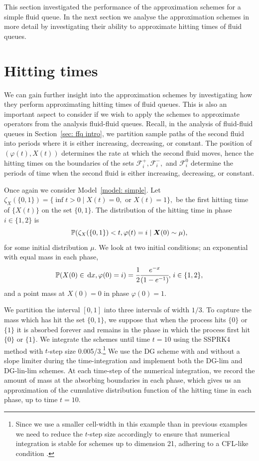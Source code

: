 This section investigated the performance of the approximation schemes for a simple fluid queue. In the next section we analyse the approximation schemes in more detail by investigating their ability to approximate hitting times of fluid queues. 

\FloatBarrier
\section{Hitting times}\label{sec: hit approx}
We can gain further insight into the approximation schemes by investigating how they perform approximating hitting times of fluid queues. This is also an important aspect to consider if we wish to apply the schemes to approximate operators from the analysis fluid-fluid queues. Recall, in the analysis of fluid-fluid queues in Section~\ref{sec: ffq intro}, we partition sample paths of the second fluid into periods where it is either increasing, decreasing, or constant. The position of \((\varphi(t),X(t))\) determines the rate at which the second fluid moves, hence the hitting times on the boundaries of the sets \(\mathcal F_i^+, \mathcal F_i^-,\) and \(\mathcal F_i^0\) determine the periods of time when the second fluid is either increasing, decreasing, or constant.

Once again we consider Model~\ref{model: simple}. Let \(\zeta_{X}(\{0,1\}) = \{\inf t>0 \mid X(t)=0, \mbox{ or }X(t)=1\},\) be the first hitting time of \(\{X(t)\}\) on the set \(\{0,1\}\). The distribution of the hitting time in phase \(i\in\{1,2\}\) is 
\begin{equation}\label{eqn: hit cdf}\mathbb P(\zeta_{X}(\{0,1\}) < t, \varphi(t)=i\mid \boldsymbol X(0)\sim \mu),\end{equation}
for some initial distribution \(\mu\). We look at two initial conditions; an exponential with equal mass in each phase, 
\[\mathbb P(X(0)\in\, \mathrm{d} x,\varphi(0)=i) = \cfrac{1}{2}\cfrac{e^{-x}}{(1-e^{-1})},\,i\in\{1,2\},\]
and a point mass at \(X(0)=0\) in phase \(\varphi(0)=1\). 

We partition the interval \([0,1]\) into three intervals of width \(1/3\). To capture the mass which has hit the set \(\{0,1\}\), we suppose that when the process hits \(\{0\}\) or \(\{1\}\) it is absorbed forever and remains in the phase in which the process first hit \(\{0\}\) or \(\{1\}\). We integrate the schemes until time \(t=10\) using the SSPRK4 method with \(t\)-step size 0.005/3.\footnote{Since we use a smaller cell-width in this example than in previous examples we need to reduce the \(t\)-step size accordingly to ensure that numerical integration is stable for schemes up to dimension 21, adhering to a CFL-like condition \cite[Section~4.8]{nodalDGBook}.} We use the DG scheme with and without a slope limiter during the time-integration and implement both the DG-lim and DG-lin-lim schemes. At each time-step of the numerical integration, we record the amount of mass at the absorbing boundaries in each phase, which gives us an approximation of the cumulative distribution function of the hitting time in each phase, up to time \(t=10\). 

